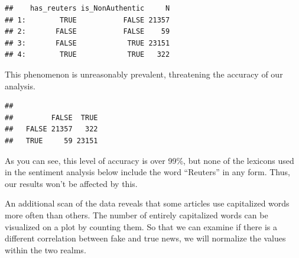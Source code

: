 \documentclass[
]{article}
\newenvironment{Shaded}{\begin{snugshade}}{\end{snugshade}}
\newcommand{\AttributeTok}[1]{\textcolor[rgb]{0.77,0.63,0.00}{#1}}
\newcommand{\FunctionTok}[1]{\textcolor[rgb]{0.00,0.00,0.00}{#1}}
\newcommand{\NormalTok}[1]{#1}
\newcommand{\OtherTok}[1]{\textcolor[rgb]{0.56,0.35,0.01}{#1}}
\newcommand{\SpecialCharTok}[1]{\textcolor[rgb]{0.00,0.00,0.00}{#1}}
\begin{document}
\begin{verbatim}
##    has_reuters is_NonAuthentic     N
## 1:        TRUE           FALSE 21357
## 2:       FALSE           FALSE    59
## 3:       FALSE            TRUE 23151
## 4:        TRUE            TRUE   322
\end{verbatim}

This phenomenon is unreasonably prevalent, threatening the accuracy of
our analysis.

\begin{Shaded}
\end{Shaded}

\begin{verbatim}
##        
##         FALSE  TRUE
##   FALSE 21357   322
##   TRUE     59 23151
\end{verbatim}

As you can see, this level of accuracy is over 99\%, but none of the
lexicons used in the sentiment analysis below include the word
``Reuters'' in any form. Thus, our results won't be affected by this.

An additional scan of the data reveals that some articles use
capitalized words more often than others. The number of entirely
capitalized words can be visualized on a plot by counting them. So that
we can examine if there is a different correlation between fake and true
news, we will normalize the values within the two realms.
\end{document}
